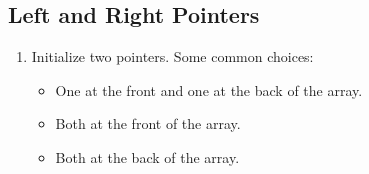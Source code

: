 \subsection{Left and Right Pointers}
\begin{algo}
    \begin{enumerate}
        \item Initialize two pointers. Some common choices:
        \begin{itemize}
            \item One at the front and one at the back of the array.
            \item Both at the front of the array.
            \item Both at the back of the array.
        \end{itemize}
    \end{enumerate}
\end{algo}

